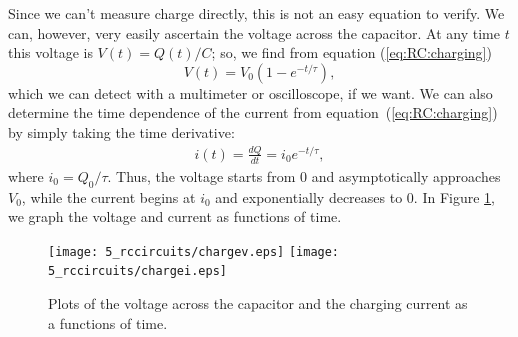 Since we can't measure charge directly, this is not an easy equation to 
verify. We can, however, very easily ascertain the voltage across the 
capacitor. At any time $t$ this voltage is $V(t)=Q(t)/C$; so, we find from 
equation (\ref{eq:RC:charging})
\begin{equation}
V(t) = V_0(1-e^{-t/\tau}), \label{eq:RC:chargingv}
\end{equation}
which we can detect with a multimeter or oscilloscope, if we want. We can also 
determine the time dependence of the current from 
equation~(\ref{eq:RC:charging}) by simply taking the time derivative:
\begin{eqnarray*}
i(t) = \frac{dQ}{dt} = i_0 e^{-t/\tau},
\end{eqnarray*}
where $i_0=Q_0/\tau$. Thus, the voltage starts from $0$ and asymptotically 
approaches $V_0$, while the current begins at $i_0$ and exponentially 
decreases to $0$. In Figure \ref{fig:RC:chargingiv}, we 
graph the voltage and current as functions of time.
\begin{figure}[htb]
\centering 
\epsfxsize=8cm \texttt{[image: 5\_rccircuits/chargev.eps]}
            \epsfxsize=8cm \texttt{[image: 5\_rccircuits/chargei.eps]}
\caption{Plots of the voltage across the capacitor and the charging current 
as a functions of time.}
\label{fig:RC:chargingiv}
\end{figure}

